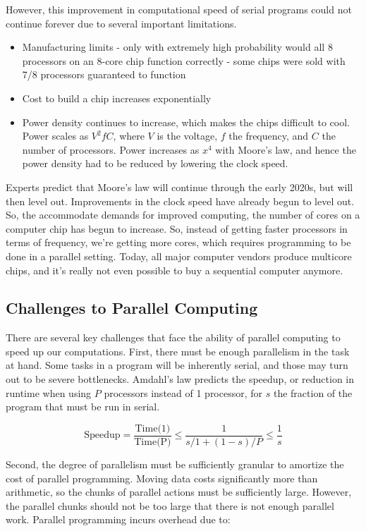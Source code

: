 \documentclass[10pt]{article}
\begin{document}
\begin{flushleft}
However, this improvement in computational speed of serial programs could not continue forever due to several important limitations.

\begin{itemize}
\item Manufacturing limits - only with extremely high probability would all 8 processors on an 8-core chip function correctly - some chips were sold with 7/8 processors guaranteed to function
\item Cost to build a chip increases exponentially
\item Power density continues to increase, which makes the chips difficult to cool. Power scales as \(V^2fC\), where \(V\) is the voltage, \(f\) the frequency, and \(C\) the number of processors. Power increases as \(x^4\) with Moore's law, and hence the power density had to be reduced by lowering the clock speed.
\end{itemize}

Experts predict that Moore's law will continue through the early 2020s, but will then level out. Improvements in the clock speed have already begun to level out. So, the accommodate demands for improved computing, the number of cores on a computer chip has begun to increase. So, instead of getting faster processors in terms of frequency, we're getting more cores, which requires programming to be done in a parallel setting. Today, all major computer vendors produce multicore chips, and it's really not even possible to buy a sequential computer anymore.

\subsection{Challenges to Parallel Computing}

There are several key challenges that face the ability of parallel computing to speed up our computations. First, there must be enough parallelism in the task at hand. Some tasks in a program will be inherently serial, and those may turn out to be severe bottlenecks. Amdahl's law predicts the speedup, or reduction in runtime when using \(P\) processors instead of 1 processor, for \(s\) the fraction of the program that must be run in serial.

\begin{equation}
\textrm{Speedup}=\frac{\textrm{Time(1)}}{\textrm{Time(P)}}\leq\frac{1}{s/1+(1-s)/P}\leq\frac{1}{s}
\end{equation}

Second, the degree of parallelism must be sufficiently granular to amortize the cost of parallel programming. Moving data costs significantly more than arithmetic, so the chunks of parallel actions must be sufficiently large. However, the parallel chunks should not be too large that there is not enough parallel work. Parallel programming incurs overhead due to:


\end{flushleft}
\end{document}
